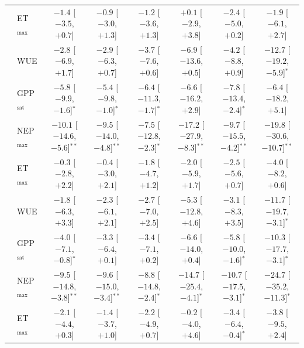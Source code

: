\begin{table}[htbp]
{\begin{tabular}{llcccccc}
 & ET$_\mathrm{max}$ & $-1.4$ {\tiny[$-3.5$, $+0.7$]} & $-0.9$ {\tiny[$-3.0$, $+1.3$]} & $-1.2$ {\tiny[$-3.6$, $+1.3$]} & $+0.1$ {\tiny[$-2.9$, $+3.8$]} & $-2.4$ {\tiny[$-5.0$, $+0.2$]} & $-1.9$ {\tiny[$-6.1$, $+2.7$]} \\
 & WUE & $-2.8$ {\tiny[$-6.9$, $+1.7$]} & $-2.9$ {\tiny[$-6.3$, $+0.7$]} & $-3.7$ {\tiny[$-7.6$, $+0.6$]} & $-6.9$ {\tiny[$-13.6$, $+0.5$]} & $-4.2$ {\tiny[$-8.8$, $+0.9$]} & $-12.7$ {\tiny[$-19.2$, $-5.9$]}$^{*}$ \\
\midrule
{} & GPP$_\mathrm{sat}$ & $-5.8$ {\tiny[$-9.9$, $-1.6$]}$^{*}$ & $-5.4$ {\tiny[$-9.8$, $-1.0$]}$^{*}$ & $-6.4$ {\tiny[$-11.3$, $-1.7$]}$^{*}$ & $-6.6$ {\tiny[$-16.2$, $+2.9$]} & $-7.8$ {\tiny[$-13.4$, $-2.4$]}$^{*}$ & $-6.4$ {\tiny[$-18.2$, $+5.1$]} \\
 & NEP$_\mathrm{max}$ & $-10.1$ {\tiny[$-14.6$, $-5.6$]}$^{**}$ & $-9.5$ {\tiny[$-14.0$, $-4.8$]}$^{**}$ & $-7.5$ {\tiny[$-12.8$, $-2.3$]}$^{*}$ & $-17.2$ {\tiny[$-27.9$, $-8.3$]}$^{**}$ & $-9.7$ {\tiny[$-15.5$, $-4.2$]}$^{**}$ & $-19.8$ {\tiny[$-30.6$, $-10.7$]}$^{**}$ \\
 & ET$_\mathrm{max}$ & $-0.3$ {\tiny[$-2.8$, $+2.2$]} & $-0.4$ {\tiny[$-3.0$, $+2.1$]} & $-1.8$ {\tiny[$-4.7$, $+1.2$]} & $-2.0$ {\tiny[$-5.9$, $+1.7$]} & $-2.5$ {\tiny[$-5.6$, $+0.7$]} & $-4.0$ {\tiny[$-8.2$, $+0.6$]} \\
 & WUE & $-1.8$ {\tiny[$-6.3$, $+3.3$]} & $-2.3$ {\tiny[$-6.1$, $+2.1$]} & $-2.7$ {\tiny[$-7.0$, $+2.5$]} & $-5.3$ {\tiny[$-12.8$, $+4.6$]} & $-3.1$ {\tiny[$-8.3$, $+3.5$]} & $-11.7$ {\tiny[$-19.7$, $-3.1$]}$^{*}$ \\
\midrule
{} & GPP$_\mathrm{sat}$ & $-4.0$ {\tiny[$-7.1$, $-0.8$]}$^{*}$ & $-3.3$ {\tiny[$-6.4$, $+0.1$]} & $-3.4$ {\tiny[$-7.1$, $+0.2$]} & $-6.6$ {\tiny[$-14.0$, $+0.4$]} & $-5.8$ {\tiny[$-10.0$, $-1.6$]}$^{*}$ & $-10.3$ {\tiny[$-17.7$, $-3.1$]}$^{*}$ \\
 & NEP$_\mathrm{max}$ & $-9.5$ {\tiny[$-14.8$, $-3.8$]}$^{**}$ & $-9.6$ {\tiny[$-15.0$, $-3.4$]}$^{**}$ & $-8.8$ {\tiny[$-14.8$, $-2.4$]}$^{*}$ & $-14.7$ {\tiny[$-25.4$, $-4.1$]}$^{*}$ & $-10.7$ {\tiny[$-17.5$, $-3.1$]}$^{*}$ & $-24.7$ {\tiny[$-35.2$, $-11.3$]}$^{*}$ \\
 & ET$_\mathrm{max}$ & $-2.1$ {\tiny[$-4.4$, $+0.3$]} & $-1.4$ {\tiny[$-3.7$, $+1.0$]} & $-2.2$ {\tiny[$-4.9$, $+0.7$]} & $-0.2$ {\tiny[$-4.0$, $+4.6$]} & $-3.4$ {\tiny[$-6.4$, $-0.4$]}$^{*}$ & $-3.8$ {\tiny[$-9.5$, $+2.4$]} \\

\end{tabular}}
\end{table}
